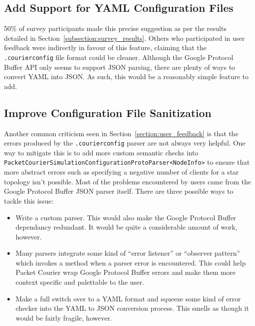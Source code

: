 \subsection{Add Support for YAML Configuration Files}\label{subsection:support_for_yaml_configuration_files}

50\% of survey participants made this precise suggestion as per the results detailed in
Section~\ref{subsection:survey_results}. Others who participated in user feedback were indirectly in favour of this
feature, claiming that the \texttt{.courierconfig} file format could be cleaner. Although the Google Protocol Buffer
API only seems to support JSON parsing\cite{com_google_protobuf_util}, there are plenty of ways to convert YAML into
JSON\cite{yaml_to_json}. As such, this would be a reasonably simple feature to add.

\subsection{Improve Configuration File Sanitization}\label{subsection:improve_configuration_file_sanitization}

Another common criticism seen in Section~\ref{section:user_feedback} is that the errors produced by the
\texttt{.courierconfig} parser are not always very helpful. One way to mitigate this is to add more custom semantic
checks into \texttt{PacketCourierSimulationConfigurationProtoParser<NodeInfo>} to ensure that more abstract errors
such as specifying a negative number of clients for a star topology isn't possible. Most of the problems encountered
by users came from the Google Protocol Buffer JSON parser itself. There are three possible ways to tackle this issue:
\begin{itemize}
    \item Write a custom parser. This would also make the Google Protocol Buffer dependancy redundant. It would be
    quite a considerable amount of work, however.
    \item Many parsers integrate some kind of ``error listener'' or ``observer pattern''\cite{observer_pattern} which
    invokes a method when a parser error is encountered. This could help Packet Courier wrap Google Protocol Buffer
    errors and make them more context specific and palettable to the user.
    \item Make a full switch over to a YAML format and squeeze some kind of error checker into the YAML to JSON
    conversion process. This smells as though it would be fairly fragile, however.
\end{itemize}

